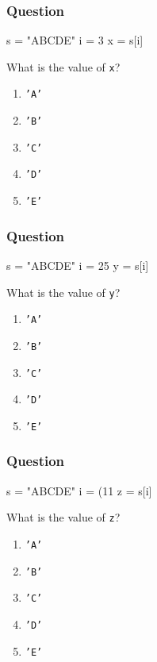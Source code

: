 \documentclass[11pt]{beamer}
\begin{document}
\begin{frame}[fragile]
  \frametitle{Question}
  \Enlarge

  \begin{semiverbatim}
s = "ABCDE"
i = 3
x = s[i]
  \end{semiverbatim}

  What is the value of \texttt{x}?
  \begin{enumerate}[label=\Alph*]
  \item  \texttt{'A'}
  \item  \texttt{'B'}
  \item  \texttt{'C'}
  \item  \texttt{'D'}
  \item  \texttt{'E'}
  \end{enumerate}
\end{frame}

\begin{frame}[fragile]
  \frametitle{Question}
  \Enlarge

  \begin{semiverbatim}
s = "ABCDE"
i = 25 %
y = s[i]
  \end{semiverbatim}

  What is the value of \texttt{y}?
  \begin{enumerate}[label=\Alph*]
  \item  \texttt{'A'}
  \item  \texttt{'B'}
  \item  \texttt{'C'}
  \item  \texttt{'D'}
  \item  \texttt{'E'}
  \end{enumerate}
\end{frame}

\begin{frame}[fragile]
  \frametitle{Question}
  \Enlarge

  \begin{semiverbatim}
s = "ABCDE"
i = (11 %
z = s[i]
  \end{semiverbatim}

  What is the value of \texttt{z}?
  \begin{enumerate}[label=\Alph*]
  \item  \texttt{'A'}
  \item  \texttt{'B'}
  \item  \texttt{'C'}
  \item  \texttt{'D'}
  \item  \texttt{'E'}
  \end{enumerate} \pause
\end{frame}
\end{document}
